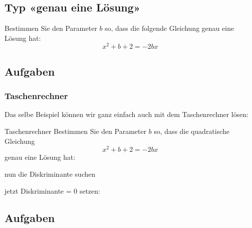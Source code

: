 \newpage

\subsection*{Typ «genau eine Lösung»}

Bestimmen Sie den Parameter $b$ so, dass die folgende Gleichung genau
eine Lösung hat:
$$x^2+b+2 = -2bx$$


\subsection*{Aufgaben}
\newpage
\subsubsection{Taschenrechner}
Das selbe Beispiel können wir ganz einfach auch mit dem Taschenrechner lösen:
\begin{beispiel}{Taschenrechner}{}
  Bestimmen Sie den Parameter $b$ so, dass die quadratische
  Gleichung $$x^2+b+2=-2bx$$
  genau eine Lösung hat:

  
  nun die Diskriminante suchen


  jetzt Diskriminante = 0 setzen:

\end{beispiel}%


\subsection*{Aufgaben}


\newpage
